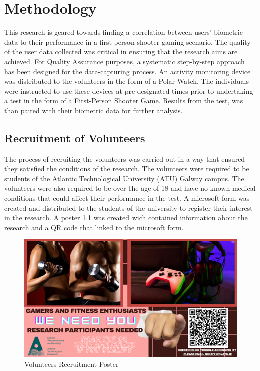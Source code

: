 \chapter{Methodology}

This research is geared towards finding a correlation between users' biometric data to their performance in a first-person shooter gaming scenario. The quality of the user data 
collected was critical in ensuring that the research aims are achieved. For Quality Assurance purposes, a systematic step-by-step approach has been designed for the data-capturing 
process. An activity monitoring device was distributed to the volunteers in the form of a Polar Watch. The individuals were instructed to use these devices at pre-designated times 
prior to undertaking a test in the form of a First-Person Shooter Game. Results from the test, was than paired with their biometric data for further analysis.

\section{Recruitment of Volunteers}
The process of recruiting the volunteers was carried out in a way that ensured they satisfied the conditions of the research. The volunteers were required to be students of the Atlantic 
Technological University (ATU) Galway campus. The volunteers were also required to be over the age of 18 and have no known medical conditions that could affect their performance in the
test. A microsoft form was created and distributed to the students of the university to register their interest in the research. A poster \ref{fig:recruitment-poster} was created
wich contained information about the research and a QR code that linked to the microsoft form.

\begin{figure}[ht]
    \centering
    \includegraphics[width=0.95\linewidth]{images/poster.png}
    \caption{Volunteers Recruitment Poster}
    \label{fig:recruitment-poster}
\end{figure}


